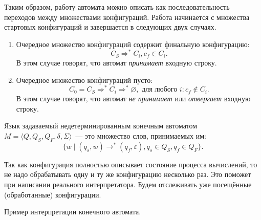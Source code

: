 Таким образом, работу автомата можно описать как последовательность переходов между множествами конфигураций. 
Работа начинается с множества стартовых конфигураций и завершается в следующих двух случаях.
\begin{enumerate}
    \item Очередное множество конфигураций содержит финальную конфигурацию:
    \[C_S \Rightarrow^* C_i, c_f \in C_i.\] В этом случае говорят, что автомат \textit{принимает} входную строку.
    \item Очередное множество конфигураций пусто:
    \[C_0 = C_S \Rightarrow^* C_i \Rightarrow^* \varnothing, \text{ для любого } i: c_f \notin C_i.\] 
    В этом случае говорят, что автомат \textit{не принимает} или \textit{отвергает} входную строку.
\end{enumerate} 

\begin{definition}
    Язык задаваемый недетерминированным конечным автоматом $M = \langle Q, Q_S, Q_F, \delta, \Sigma \rangle$~--- это множество слов, принимаемых им:
     \[ \{w \mid (q_s,w) \to^* (q_f,\varepsilon), q_s \in Q_S, q_f \in Q_F \}.\]
\end{definition}

Так как конфигурация полностью описывает состояние процесса вычислений, то не надо обрабатывать одну и ту же конфигурацию несколько раз. 
Это поможет при написании реального интерпретатора. 
Будем отслеживать уже посещённые (обработанные) конфигурации. 

\begin{example}
    Пример интерпретации конечного автомата.
\end{example}

